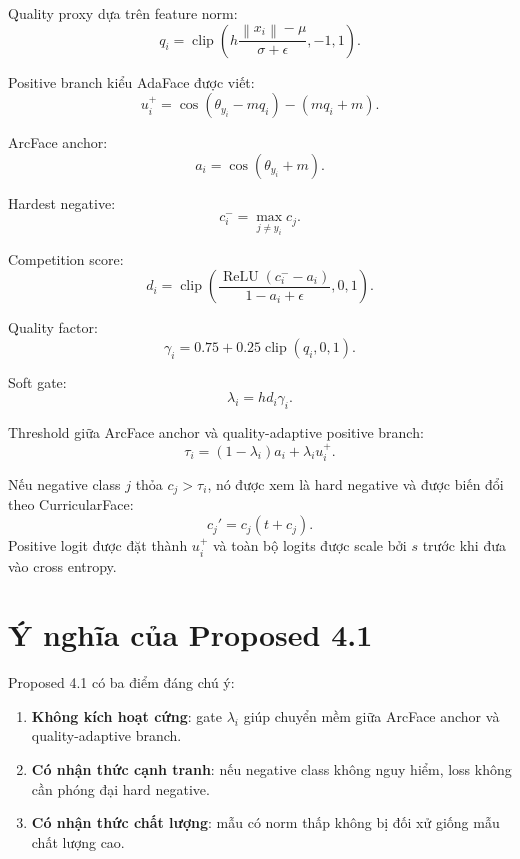 \documentclass[13pt,a4paper]{extreport}
\newcommand{\norm}[1]{\left\lVert #1 \right\rVert}
\newcommand{\clip}{\operatorname{clip}}
\newcommand{\ReLU}{\operatorname{ReLU}}
\begin{document}
Quality proxy dựa trên feature norm:
\begin{equation}
    q_i = \clip\left(h\frac{\norm{x_i}-\mu}{\sigma+\epsilon}, -1, 1\right).
\end{equation}

Positive branch kiểu AdaFace được viết:
\begin{equation}
    u_i^+ = \cos(\theta_{y_i}-m q_i) - (m q_i + m).
\end{equation}

ArcFace anchor:
\begin{equation}
    a_i = \cos(\theta_{y_i}+m).
\end{equation}

Hardest negative:
\begin{equation}
    c_i^- = \max_{j\ne y_i} c_j.
\end{equation}

Competition score:
\begin{equation}
    d_i = \clip\left(\frac{\ReLU(c_i^- - a_i)}{1-a_i+\epsilon},0,1\right).
\end{equation}

Quality factor:
\begin{equation}
    \gamma_i = 0.75 + 0.25\clip(q_i,0,1).
\end{equation}

Soft gate:
\begin{equation}
    \lambda_i = h d_i \gamma_i.
\end{equation}

Threshold giữa ArcFace anchor và quality-adaptive positive branch:
\begin{equation}
    \tau_i=(1-\lambda_i)a_i + \lambda_i u_i^+.
\end{equation}

Nếu negative class $j$ thỏa $c_j>\tau_i$, nó được xem là hard negative và được biến đổi theo CurricularFace:
\begin{equation}
    c_j' = c_j(t+c_j).
\end{equation}
Positive logit được đặt thành $u_i^+$ và toàn bộ logits được scale bởi $s$ trước khi đưa vào cross entropy.

\section{Ý nghĩa của Proposed 4.1}
Proposed 4.1 có ba điểm đáng chú ý:
\begin{enumerate}[leftmargin=1.2cm]
    \item \textbf{Không kích hoạt cứng}: gate $\lambda_i$ giúp chuyển mềm giữa ArcFace anchor và quality-adaptive branch.
    \item \textbf{Có nhận thức cạnh tranh}: nếu negative class không nguy hiểm, loss không cần phóng đại hard negative.
    \item \textbf{Có nhận thức chất lượng}: mẫu có norm thấp không bị đối xử giống mẫu chất lượng cao.
\end{enumerate}
\end{document}
